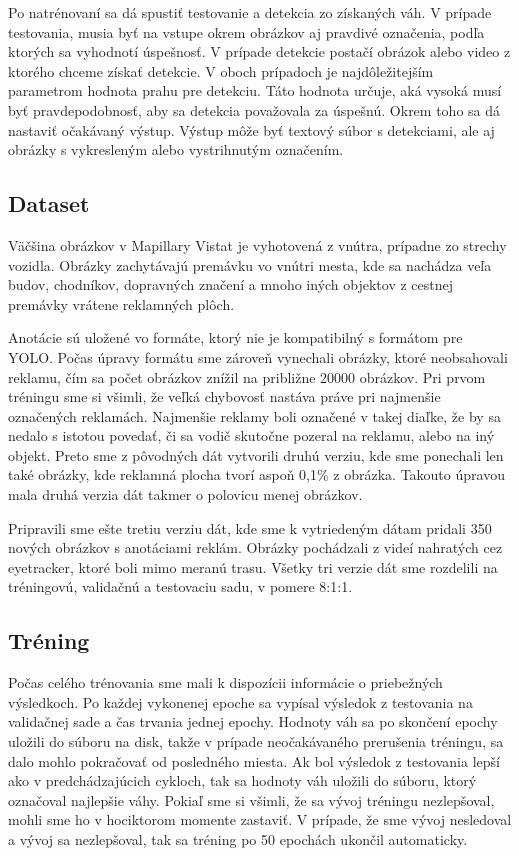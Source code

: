 Po natrénovaní sa dá spustiť testovanie a detekcia zo získaných váh. V prípade testovania, musia byť na vstupe okrem obrázkov aj pravdivé označenia, podľa ktorých sa vyhodnotí úspešnosť. V prípade detekcie postačí obrázok alebo video z ktorého chceme získať detekcie. V oboch prípadoch je najdôležitejším parametrom hodnota prahu pre detekciu. Táto hodnota určuje, aká vysoká musí byť pravdepodobnosť, aby sa detekcia považovala za úspešnú. Okrem toho sa dá nastaviť očakávaný výstup. Výstup môže byť textový súbor s detekciami, ale aj obrázky s vykresleným alebo vystrihnutým označením.

\subsection{Dataset}

Väčšina obrázkov v Mapillary Vistat je vyhotovená z vnútra, prípadne zo strechy vozidla. Obrázky zachytávajú premávku vo vnútri mesta, kde sa nachádza veľa budov, chodníkov, dopravných značení a mnoho iných objektov z cestnej premávky vrátene reklamných plôch.

Anotácie sú uložené vo formáte, ktorý nie je kompatibilný s formátom pre YOLO. Počas úpravy formátu sme zároveň vynechali obrázky, ktoré neobsahovali reklamu, čím sa počet obrázkov znížil na približne 20000 obrázkov. Pri prvom tréningu sme si všimli, že veľká chybovosť nastáva práve pri najmenšie označených reklamách. Najmenšie reklamy boli označené v takej diaľke, že by sa nedalo s istotou povedať, či sa vodič skutočne pozeral na reklamu, alebo na iný objekt. Preto sme z pôvodných dát vytvorili druhú verziu, kde sme ponechali len také obrázky, kde reklamná plocha tvorí aspoň 0,1\% z obrázka. Takouto úpravou mala druhá verzia dát takmer o polovicu menej obrázkov.

Pripravili sme ešte tretiu verziu dát, kde sme k vytriedeným dátam pridali 350 nových obrázkov s anotáciami reklám. Obrázky pochádzali z videí nahratých cez eyetracker, ktoré boli mimo meranú trasu. Všetky tri verzie dát sme rozdelili na tréningovú, validačnú a testovaciu sadu, v pomere 8:1:1.

\subsection{Tréning}

Počas celého trénovania sme mali k dispozícii informácie o priebežných výsledkoch. Po každej vykonenej epoche sa vypísal výsledok z testovania na validačnej sade a čas trvania jednej epochy. Hodnoty váh sa po skončení epochy uložili do súboru na disk, takže v prípade neočakávaného prerušenia tréningu, sa dalo mohlo pokračovať od posledného miesta. Ak bol výsledok z testovania lepší ako v predchádzajúcich cykloch, tak sa hodnoty váh uložili do súboru, ktorý označoval najlepšie váhy. Pokiaľ sme si všimli, že sa vývoj tréningu nezlepšoval, mohli sme ho v hociktorom momente zastaviť. V prípade, že sme vývoj nesledoval a vývoj sa nezlepšoval, tak sa tréning po 50 epochách ukončil automaticky.


